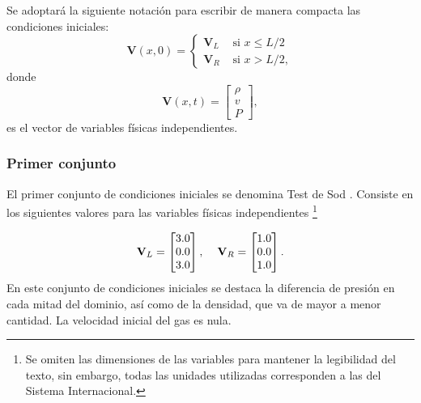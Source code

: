 Se adoptará la siguiente notación para escribir de manera compacta las condiciones iniciales:
\begin{equation}
	\mathbf{V}(x,0) = 
	\begin{cases}
		\mathbf{V}_{L} & \text{ si } x \leq L/2\\
		\mathbf{V}_{R} & \text{ si } x > L/2,
	\end{cases}
\end{equation}
donde
\begin{equation}
\mathbf{V}(x,t) = 
	\begin{bmatrix}
		\rho \\
		v \\
		P
	\end{bmatrix},
\end{equation}
es el vector de variables físicas independientes.

\subsubsection{Primer conjunto}
El primer conjunto de condiciones iniciales se denomina Test de Sod \cite{thesis-euler-godunov}. Consiste en los siguientes valores para las variables físicas independientes \footnote{Se omiten las dimensiones de las variables para mantener la legibilidad del texto, sin embargo, todas las unidades utilizadas corresponden a las del Sistema Internacional.}

\begin{equation}
\mathbf{V}_L = 
	\begin{bmatrix}
		3.0\\
		0.0\\
		3.0
	\end{bmatrix},\hspace{4mm}
\mathbf{V}_R = 
	\begin{bmatrix}
		1.0\\
		0.0\\
		1.0
	\end{bmatrix}.
\end{equation}
En este conjunto de condiciones iniciales se destaca la diferencia de presión en cada mitad del dominio, así como de la densidad, que va de mayor a menor cantidad. La velocidad inicial del gas es nula.

